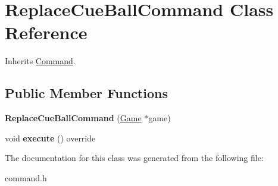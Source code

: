 \hypertarget{class_replace_cue_ball_command}{}\section{Replace\+Cue\+Ball\+Command Class Reference}
\label{class_replace_cue_ball_command}


Inherits \mbox{\hyperlink{class_command}{Command}}.

\subsection*{Public Member Functions}
\begin{DoxyCompactItemize}
\item 
\mbox{\label{class_replace_cue_ball_command_a985dc20c0ab56b7c58adb7c893ee1838}} 
{\bfseries Replace\+Cue\+Ball\+Command} (\mbox{\hyperlink{class_game}{Game}} $\ast$game)
\item 
\mbox{\label{class_replace_cue_ball_command_acf101ca476cfa058dc3864664db07974}} 
void {\bfseries execute} () override
\end{DoxyCompactItemize}


The documentation for this class was generated from the following file\+:\begin{DoxyCompactItemize}
\item 
command.\+h\end{DoxyCompactItemize}
